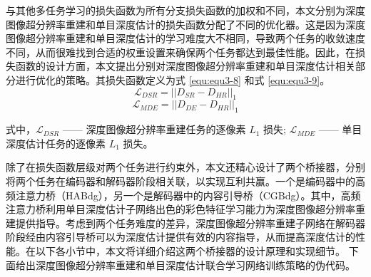 与其他多任务学习的损失函数为所有分支损失函数的加权和不同，本文分别为深度图像超分辨率重建和单目深度估计的损失函数分配了不同的优化器。这是因为深度图像超分辨率重建和单目深度估计的学习难度大不相同，导致两个任务的收敛速度不同，从而很难找到合适的权重设置来确保两个任务都达到最佳性能。因此，在损失函数的设计方面，本文提出分别对深度图像超分辨率重建和单目深度估计相关部分进行优化的策略。其损失函数定义为式 \ref{equ:equ3-8} 和式 \ref{equ:equ3-9}。
\vspace{-0.3cm}
\begin{equation}
	\mathcal{L}_{DSR}=||D_{SR}-D_{HR}||_1
	\label{equ:equ3-8}
\end{equation}
\vspace{-0.8cm}
\begin{equation}
	\mathcal{L}_{MDE}=||D_{DE}-D_{HR}||_1
	\label{equ:equ3-9}
\end{equation}

\noindent 式中，$\mathcal{L}_{DSR}$ —— 深度图像超分辨率重建任务的逐像素 $L_1$ 损失;\newline
\indent\quad $\mathcal{L}_{MDE}$ —— 单目深度估计任务的逐像素 $L_1$ 损失。

除了在损失函数层级对两个任务进行约束外，本文还精心设计了两个桥接器，分别将两个任务在编码器和解码器阶段相关联，以实现互利共赢。一个是编码器中的高频注意力桥（HABdg），另一个是解码器中的内容引导桥（CGBdg）。其中，高频注意力桥利用单目深度估计子网络出色的彩色特征学习能力为深度图像超分辨率重建提供指导。考虑到两个任务难度的差异，深度图像超分辨率重建子网络在解码器阶段经由内容引导桥可以为深度估计提供有效的内容指导，从而提高深度估计的性能。在以下各小节中，本文将详细介绍这两个桥接器的设计原理和实现细节。
下面给出深度图像超分辨率重建和单目深度估计联合学习网络训练策略的伪代码。

